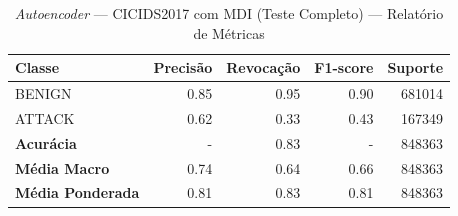 \begin{table}[H]
    \centering
    \small
    \begin{tabular}{lrrrr}
        \hline
        Classe                   & Precisão & Revocação & F1-score & Suporte \\
        \hline
        BENIGN                   & 0.85     & 0.95      & 0.90     & 681014  \\
        ATTACK                   & 0.62     & 0.33      & 0.43     & 167349  \\
        \hline
        \textbf{Acurácia}        & -        & 0.83      & -        & 848363  \\
        \textbf{Média Macro}     & 0.74     & 0.64      & 0.66     & 848363  \\
        \textbf{Média Ponderada} & 0.81     & 0.83      & 0.81     & 848363  \\
        \hline
    \end{tabular}
    \caption{\textit{Autoencoder} — CICIDS2017 com MDI (Teste Completo) — Relatório de Métricas}
    \label{table:ae_cicids_mdi_completo_metricas}
\end{table}
